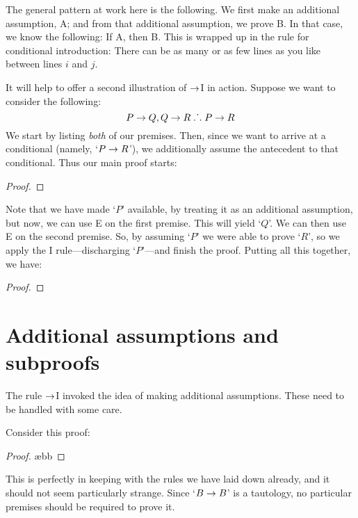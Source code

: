 The general pattern at work here is the following. We first make an additional assumption, A; and from that additional assumption, we prove B. In that case, we know the following: If A, then B. This is wrapped up in the rule for conditional introduction:
There can be as many or as few lines as you like between lines $i$ and $j$. 

It will help to offer a second  illustration of $\rightarrow$I in action. Suppose we want to consider the following:
	$$P \rightarrow Q, Q \rightarrow R \mathrel{\ldotp\dot{}\,\ldotp} P \rightarrow R$$
We start by listing \emph{both} of our premises. Then, since we want to arrive at a conditional (namely, `$P \rightarrow R$'), we additionally assume the antecedent to that conditional. Thus our main proof starts:
\begin{proof}
	\open
	\close
\end{proof}
Note that we have made `$P$' available, by treating it as an additional assumption, but now, we can use {\eif}E on the first premise. This will yield `$Q$'. We can then use {\eif}E on the second premise. So, by assuming `$P$' we were able to prove `$R$', so we apply the {\eif}I rule---discharging `$P$'---and finish the proof. Putting all this together, we have:
\label{HSproof}
\begin{proof}
	\open
	\close
\end{proof}


\section{Additional assumptions and subproofs}
The rule $\rightarrow$I invoked the idea of making additional assumptions. These need to be handled with some care.

Consider this proof:
\begin{proof}
	\open
		 \ae{bb}
	\close
\end{proof}
This is perfectly in keeping with the rules we have laid down already, and it should not seem particularly strange. Since `$B \rightarrow B$' is a tautology, no particular premises should be required to prove it. 

